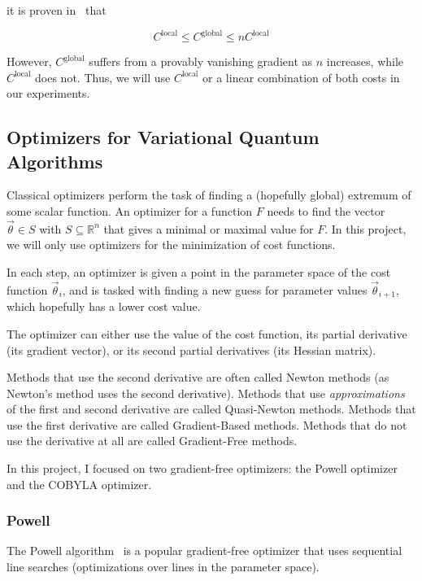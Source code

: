 \documentclass[a4paper,12pt]{article}
\newcommand{\thetas}{\vec{\theta}}
\begin{document}
it is proven in~\cite{sharma_noise_2020} that

\begin{equation}
    C^{\textrm{local}} \leq C^{\textrm{global}} \leq nC^{\textrm{local}}
\end{equation} 

However, $C^\textrm{global}$ suffers from a provably vanishing gradient as $n$ increases, while $C^\textrm{local}$ does not. Thus, we will use $C^\textrm{local}$ or a linear combination of both costs in our experiments.

\subsection{Optimizers for Variational Quantum Algorithms} \label{subsec:optimizers}
Classical optimizers perform the task of finding a (hopefully global) extremum of some scalar function.
An optimizer for a function $F$ needs to find the vector $\thetas \in S$ with $S \subseteq \mathbb{R}^n$ that gives a minimal or maximal value for $F$. In this project, we will only use optimizers for the minimization of cost functions.

In each step, an optimizer is given a point in the parameter space of the cost function $\thetas_{i}$, and is tasked with finding a new guess for parameter values $\thetas_{i+1}$, which hopefully has a lower cost value.

The optimizer can either use the value of the cost function, its partial derivative (its gradient vector), or its second partial derivatives (its Hessian matrix).

Methods that use the second derivative are often called Newton methods (as Newton's method uses the second derivative). Methods that use \emph{approximations} of the first and second derivative are called Quasi-Newton methods.
Methods that use the first derivative are called Gradient-Based methods. Methods that do not use the derivative at all are called Gradient-Free methods.

In this project, I focused on two gradient-free optimizers: the Powell optimizer and the COBYLA optimizer.

\subsubsection{Powell}
The Powell algorithm~\cite{Powell1964} is a popular gradient-free optimizer that uses sequential line searches (optimizations over lines in the parameter space).
\end{document}
